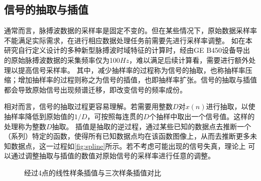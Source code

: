 \subsection{信号的抽取与插值}
通常而言，脉搏波数据的采样率是固定不变的。但在某些情况下，原始数据采样率不能满足实际需求，在进行相应数据处理任务前需要先进行采样率调整。
如在本研究自行定义设计的多种新型脉搏波时域特征的计算时，经由GE B450设备导出的原始脉搏波数据的采集频率仅为100$Hz$，难以满足后续计算看，需要进行额外处理以提高信号采样率。
其中，减少抽样率的过程称为信号的抽取，也称抽样率压缩；增加抽样率的过程则称之为信号的插值，也即抽样率扩张\cite{Cheng2008}。信号的抽取与插值都会导致原始信号出现频谱迁移，即改变信号的频率成份\cite{Cheng2008}。

相对而言，信号的抽取过程更容易理解。若需要用整数$D$对$x(n)$进行抽取，以使抽样率降低到原始值的$1/D$，可按照每连贯的$D$个抽样中取出一个信号值。这样的处理称为整数$D$抽取\cite{Cheng2008}。
插值是抽取的逆过程，通过某些已知的数据点去推断一个（系列）特定的函数，使得所有已知数据点均在该函数图像上，从而去推断更多未知数据点，这一过程如\autoref{fig:spline}所示。若不考虑可能出现的信号失真，理论上
可以通过调整抽取与插值的数值对原始信号的采样率进行任意的调整。
\begin{figure}[htbp]
    \centering
    \quad
    \caption{\label{fig:spline}经过4点的线性样条插值与三次样条插值对比}
\end{figure}

